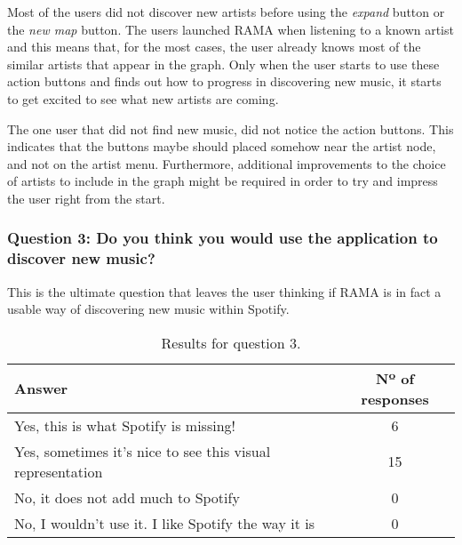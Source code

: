       Most of the users did not discover new artists before using the \emph{expand} button or the \emph{new map} button.
      The users launched RAMA when listening to a known artist and this means that, for the most cases, the user already knows most of the similar artists that appear in the graph.
      Only when the user starts to use these action buttons and finds out how to progress in discovering new music, it starts to get excited to see what new artists are coming.

      The one user that did not find new music, did not notice the action buttons.
      This indicates that the buttons maybe should placed somehow near the artist node, and not on the artist menu.
      Furthermore, additional improvements to the choice of artists to include in the graph might be required in order to try and impress the user right from the start.

    \subsubsection{Question 3: Do you think you would use the application to discover new music?}
    \label{ssub:question_3}

      This is the ultimate question that leaves the user thinking if RAMA is in fact a usable way of discovering new music within Spotify.

      \begin{table}[H]
         \begin{center}
           \begin{tabular}{l|c}
       
           \hline
           \textbf{Answer} & \textbf{Nº of responses} \\
           \hline

           \hline
            Yes, this is what Spotify is missing! & 6 \\
            Yes, sometimes it's nice to see this visual representation & 15 \\
            No, it does not add much to Spotify & 0 \\
            No, I wouldn't use it. I like Spotify the way it is & 0 \\
           \hline
           \end{tabular}
         \end{center}
         \caption{Results for question 3.}
         \label{tab:question3}
       \end{table}

